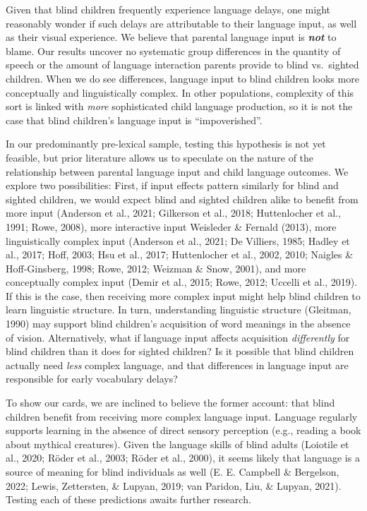 \documentclass[
  man]{apa6}
\begin{document}
Given that blind children frequently experience language delays, one might reasonably wonder if such delays are attributable to their language input, as well as their visual experience. We believe that parental language input is \textbf{\emph{not}} to blame. Our results uncover no systematic group differences in the quantity of speech or the amount of language interaction parents provide to blind vs.~sighted children. When we do see differences, language input to blind children looks more conceptually and linguistically complex. In other populations, complexity of this sort is linked with \emph{more} sophisticated child language production, so it is not the case that blind children's language input is ``impoverished''.

In our predominantly pre-lexical sample, testing this hypothesis is not yet feasible, but prior literature allows us to speculate on the nature of the relationship between parental language input and child language outcomes. We explore two possibilities: First, if input effects pattern similarly for blind and sighted children, we would expect blind and sighted children alike to benefit from more input (Anderson et al., 2021; Gilkerson et al., 2018; Huttenlocher et al., 1991; Rowe, 2008), more interactive input Weisleder \& Fernald (2013), more linguistically complex input (Anderson et al., 2021; De Villiers, 1985; Hadley et al., 2017; Hoff, 2003; Hsu et al., 2017; Huttenlocher et al., 2002, 2010; Naigles \& Hoff-Ginsberg, 1998; Rowe, 2012; Weizman \& Snow, 2001), and more conceptually complex input (Demir et al., 2015; Rowe, 2012; Uccelli et al., 2019). If this is the case, then receiving more complex input might help blind children to learn linguistic structure. In turn, understanding linguistic structure (Gleitman, 1990) may support blind children's acquisition of word meanings in the absence of vision. Alternatively, what if language input affects acquisition \emph{differently} for blind children than it does for sighted children? Is it possible that blind children actually need \emph{less} complex language, and that differences in language input are responsible for early vocabulary delays?

To show our cards, we are inclined to believe the former account: that blind children benefit from receiving more complex language input. Language regularly supports learning in the absence of direct sensory perception (e.g., reading a book about mythical creatures). Given the language skills of blind adults (Loiotile et al., 2020; Röder et al., 2003; Röder et al., 2000), it seems likely that language is a source of meaning for blind individuals as well (E. E. Campbell \& Bergelson, 2022; Lewis, Zettersten, \& Lupyan, 2019; van Paridon, Liu, \& Lupyan, 2021). Testing each of these predictions awaits further research.
\end{document}
